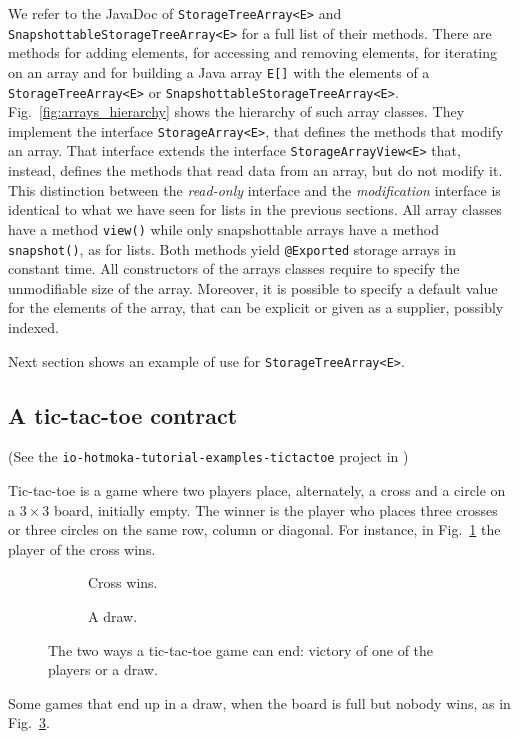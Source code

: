 We refer to the JavaDoc of \texttt{StorageTreeArray<E>}
and \texttt{SnapshottableStorageTreeArray<E>} for a full list of their methods.
There are methods for adding elements, for accessing and
removing elements, for iterating on an array and for building a Java array
\texttt{E[]} with the elements of a \texttt{StorageTreeArray<E>}
or \texttt{SnapshottableStorageTreeArray<E>}.
Fig.~\ref{fig:arrays_hierarchy} shows the hierarchy of such array classes.
They implement the interface
\texttt{StorageArray<E>},
that defines the methods that modify an array.
That interface extends the interface
\texttt{StorageArrayView<E>}
that, instead, defines the methods
that read data from an array, but do not modify it.
This distinction between the \emph{read-only}
interface and the \emph{modification} interface is identical
to what we have seen for lists in the previous
sections. All array classes have a method
\texttt{view()} while only
snapshottable arrays have a method
\texttt{snapshot()}, as for lists.
Both methods yield \texttt{@Exported}
storage arrays in constant time. All constructors of the
arrays classes require to specify the unmodifiable
size of the array. Moreover, it is possible to specify
a default value for the elements of the
array, that can be explicit or given as a supplier, possibly indexed.

Next section shows an example of use for \texttt{StorageTreeArray<E>}.

\subsection{A tic-tac-toe contract}\label{subsec:tic_tac_toe}

\begin{center}
(See the \texttt{io-hotmoka-tutorial-examples-tictactoe} project in \hotmokaRepo{})
\end{center}

Tic-tac-toe is a game where two players place, alternately,
a cross and a circle on a $3\times 3$ board, initially empty. The winner is the
player who places three crosses or three circles on the same row,
column or diagonal. For instance, in Fig.~\ref{fig:cross_wins} the player of
the cross wins.
%
\begin{figure}
\centering
\begin{subfigure}{.5\textwidth}
  \centering
  \caption{Cross wins.}
  \label{fig:cross_wins}
\end{subfigure}%
\begin{subfigure}{.5\textwidth}
  \centering
  \caption{A draw.}
  \label{fig:tictactoe_draw}
\end{subfigure}
\caption{The two ways a tic-tac-toe game can end: victory of one of the players or a draw.}
\end{figure}
%
Some games that end up in a draw, when the board is full but nobody wins,
as in Fig.~\ref{fig:tictactoe_draw}.

